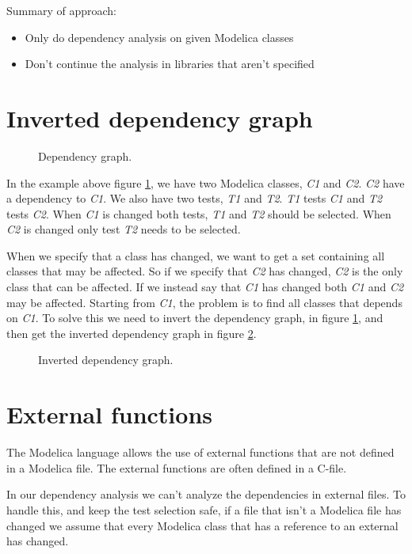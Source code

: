 \documentclass{cslthse-msc}
\begin{document}
Summary of approach:
\begin{itemize}
	\item Only do dependency analysis on given Modelica classes
	\item Don't continue the analysis in libraries that aren't specified
\end{itemize}
\section{Inverted dependency graph}
\begin{figure}[H]
    \centering
    \caption{Dependency graph.}
    \label{fig:dependencyGraph}
\end{figure}
In the example above figure \ref{fig:dependencyGraph}, we have two Modelica classes, \textit{C1} and \textit{C2}. \textit{C2} have a dependency to \textit{C1}. We also have two tests, \textit{T1} and \textit{T2}. \textit{T1} tests \textit{C1} and \textit{T2} tests \textit{C2}. When \textit{C1} is changed both tests, \textit{T1} and \textit{T2} should be selected. When \textit{C2} is changed only test \textit{T2} needs to be selected.

When we specify that a class has changed, we want to get a set containing all classes that may be affected. So if we specify that \textit{C2} has changed, \textit{C2} is the only class that can be affected. If we instead say that \textit{C1} has changed both \textit{C1} and \textit{C2} may be affected. Starting from \textit{C1}, the problem is to find all classes that depends on \textit{C1}. To solve this we need to invert the dependency graph, in figure \ref{fig:dependencyGraph}, and then get the inverted dependency graph in figure \ref{fig:invertedGraph}. 
\begin{figure}[H]
    \centering
    \caption{Inverted dependency graph.}
    \label{fig:invertedGraph}
\end{figure}
\section{External functions}
The Modelica language allows the use of external functions that are not defined in a Modelica file. The external functions are often defined in a C-file.\cite{modelicamodelica}

In our dependency analysis we can't analyze the dependencies in external files. To handle this, and keep the test selection safe, if a file that isn't a Modelica file has changed we assume that every Modelica class that has a reference to an external has changed.
\end{document}
